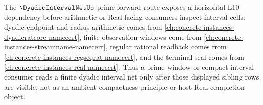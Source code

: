 The $\DyadicIntervalNetUp$ prime forward route exposes a horizontal L10 dependency before arithmetic or Real-facing consumers inspect interval cells: dyadic endpoint and radius arithmetic comes from \autoref{ch:concrete-instances-dyadicratcore-namecert}, finite observation windows come from \autoref{ch:concrete-instances-streamname-namecert}, regular rational readback comes from \autoref{ch:concrete-instances-regseqrat-namecert}, and the terminal seal comes from \autoref{ch:concrete-instances-real-namecert}. Thus a prime-window or compact-interval consumer reads a finite dyadic interval net only after those displayed sibling rows are visible, not as an ambient compactness principle or host Real-completion object.
